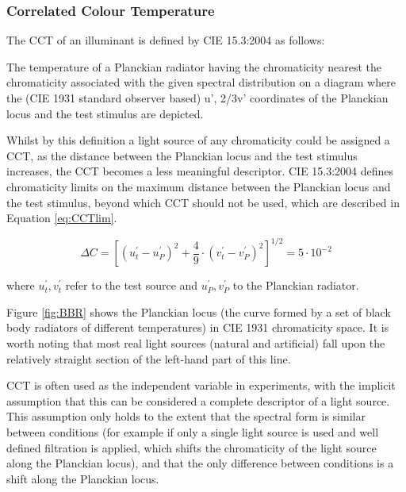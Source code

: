 \subsubsection{Correlated Colour Temperature}

The \acrfull{CCT} of an illuminant is defined by CIE 15.3:2004 \citep{cie_cie_2004-2} as follows:

\begin{itquote}{}
The temperature of a Planckian radiator having the chromaticity nearest the chromaticity associated with the given spectral distribution on a diagram where the (CIE 1931 standard observer based) u', 2/3v' coordinates of the Planckian locus and the test stimulus are depicted.
\end{itquote}

Whilst by this definition a light source of any chromaticity could be assigned a \gls{CCT}, as the distance between the Planckian locus and the test stimulus increases, the \gls{CCT} becomes a less meaningful descriptor. CIE 15.3:2004 \citep{cie_cie_2004-2} defines chromaticity limits on the maximum distance between the Planckian locus and the test stimulus, beyond which \gls{CCT} should not be used, which are described in Equation \ref{eq:CCTlim}.

\begin{equation}
\Delta C=\left[\left(u_{t}^{\prime}-u_{P}^{\prime}\right)^{2}+\frac{4}{9} \cdot\left(v_{t}^{\prime}-v_{P}^{\prime}\right)^{2}\right]^{1 / 2}=5 \cdot 10^{-2}
\label{eq:CCTlim}
\end{equation}

where $u^{\prime}_{t}, v^{\prime}_{t}$ refer to the test source and $u^{\prime}_{P}, v^{\prime}_{P}$ to the Planckian radiator.

Figure \ref{fig:BBR} shows the Planckian locus (the curve formed by a set of black body radiators of different temperatures) in \gls{CIE} 1931 chromaticity space. It is worth noting that most real light sources (natural and artificial) fall upon the relatively straight section of the left-hand part of this line.

\gls{CCT} is often used as the independent variable in experiments, with the implicit assumption that this can be considered a complete descriptor of a light source. This assumption only holds to the extent that the spectral form is similar between conditions (for example if only a single light source is used and well defined filtration is applied, which shifts the chromaticity of the light source along the Planckian locus), and that the only difference between conditions is a shift along the Planckian locus. 

